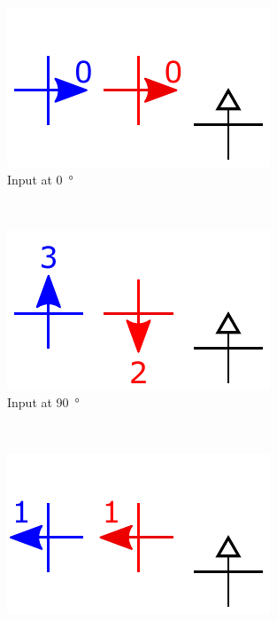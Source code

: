 \documentclass[11pt,a4paper,english,twoside]{article}
\newcommand{\rulesep}{\unskip\ \vrule\ }
\begin{document}
\begin{figure}
    \centering
    \begin{subfigure}[t]{0.23\textwidth}
        \includegraphics[width=\textwidth]{Figures/half_adder/schematic/000006side_inputs_In1_0312/Input 0 deg arrowtext.pdf}
        \caption{Input at \SI{0}{\degree}}
    \end{subfigure}
    \rulesep
    \begin{subfigure}[t]{0.23\textwidth}
        \includegraphics[width=\textwidth]{Figures/half_adder/schematic/000006side_inputs_In1_0312/Input 90 deg arrowtext.pdf}
        \caption{Input at \SI{90}{\degree}}
    \end{subfigure}
    \rulesep
    \begin{subfigure}[t]{0.23\textwidth}
        \includegraphics[width=\textwidth]{Figures/half_adder/schematic/000006side_inputs_In1_0312/Input 180 deg arrowtext.pdf}

\end{subfigure}
\end{figure}
\end{document}
